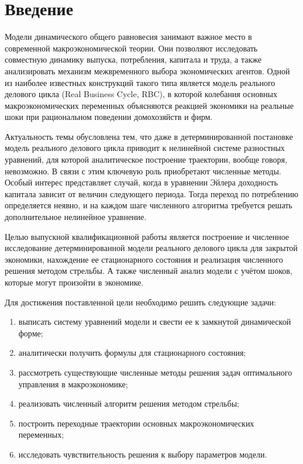 \documentclass[12pt,a4paper]{report}   %
\begin{document}
    \setcounter{page}{2}

    \tableofcontents
    \clearpage


    \chapter*{Введение}

        Модели динамического общего равновесия занимают важное место в современной макроэкономической теории. Они позволяют исследовать совместную динамику выпуска, потребления, капитала и труда, а также анализировать механизм межвременного выбора экономических агентов. Одной из наиболее известных конструкций такого типа является модель реального делового цикла (Real Business Cycle, RBC), в которой колебания основных макроэкономических переменных объясняются реакцией экономики на реальные шоки при рациональном поведении домохозяйств и фирм.

        Актуальность темы обусловлена тем, что даже в детерминированной постановке модель реального делового цикла приводит к нелинейной системе разностных уравнений, для которой аналитическое построение траектории, вообще говоря, невозможно. В связи с этим ключевую роль приобретают численные методы. Особый интерес представляет случай, когда в уравнении Эйлера доходность капитала зависит от величин следующего периода. Тогда переход по потреблению определяется неявно, и на каждом шаге численного алгоритма требуется решать дополнительное нелинейное уравнение.

        Целью выпускной квалификационной работы является построение и численное исследование детерминированной модели реального делового цикла для закрытой экономики, нахождение ее стационарного состояния и реализация численного решения методом стрельбы. А также численный анализ модели с учётом шоков, которые могут произойти в экономике. 

        Для достижения поставленной цели необходимо решить следующие задачи:
        \begin{enumerate}[label=\arabic*)]
            \item выписать систему уравнений модели и свести ее к замкнутой динамической форме;
            \item аналитически получить формулы для стационарного состояния;
            \item рассмотреть существующие численные методы решения задач оптимального управления в макроэкономике;
            \item реализовать численный алгоритм решения методом стрельбы;
            \item построить переходные траектории основных макроэкономических переменных;
            \item исследовать чувствительность решения к выбору параметров модели.
        \end{enumerate}
\end{document}
